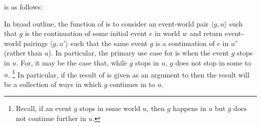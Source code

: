 \begin{note}
  \AlgFindBranches{} is as follows:

  \begin{algorithm}[H]
    \label{PrAl:find-branches}
    \caption{\AlgFindBranches{}}
    \SetAlgoLined
    \DontPrintSemicolon
  \end{algorithm}
\end{note}

\begin{note}
  In broad outline, the function of \AlgFindBranches{} is to consider an event-world pair \(\langle g,u \rangle\) such that \(g\) is the continuation of some initial event \(e\) in world \(w\) and return event-world pairings \(\langle g,u' \rangle\) such that the same event \(g\) is a continuation of \(e\) in \(u'\) (rather than \(u\)).
  In particular, the primary use case for \AlgFindBranches{} is when the event \(g\) stops in \(u\).
  For, it may be the case that, while \(g\) stops in \(u\), \(g\) does not stop in some  to \(u\).%
  \footnote{
    Recall, if an event \(g\) stops in some world \(u\), then \(g\) happens in \(u\) but \(g\) does not continue further in \(u\).
  }
  In particular, if the result of \AlgFindBranches{} is given as an argument to \AlgAC{} then the result will be a collection of ways in which \(g\) continues in  to \(u\).
\end{note}

